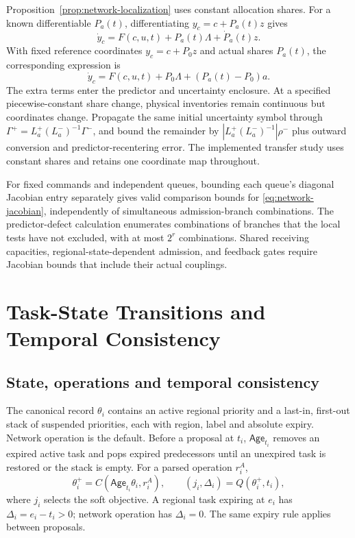 \documentclass[journal,10pt]{IEEEtran}
\begin{document}
Proposition~\ref{prop:network-localization} uses constant allocation shares.
For a known differentiable $P_a(t)$, differentiating $y_c=c+P_a(t)z$ gives
\begin{equation}
 \dot y_c=F(c,u,t)+P_a(t)\Lambda+\dot P_a(t)z.
 \label{eq:network-varying-allocation}
\end{equation}
With fixed reference coordinates $y_c=c+P_0z$ and actual shares $P_a(t)$,
the corresponding expression is
\begin{equation}
 \dot y_c=F(c,u,t)+P_0\Lambda+(P_a(t)-P_0)a.
 \label{eq:network-uncertain-allocation}
\end{equation}
The extra terms enter the predictor and uncertainty enclosure. At a specified
piecewise-constant share change, physical inventories remain continuous but
coordinates change. Propagate the same initial uncertainty symbol through
$\Gamma^+=L_a^+(L_a^-)^{-1}\Gamma^-$, and bound the remainder by
$|L_a^+(L_a^-)^{-1}|\rho^-$ plus outward conversion and predictor-recentering
error. The implemented
transfer study uses constant shares and retains one coordinate map throughout.

For fixed commands and independent queues, bounding each queue's diagonal
Jacobian entry separately gives valid comparison bounds for
\eqref{eq:network-jacobian}, independently of simultaneous admission-branch
combinations. The predictor-defect calculation enumerates combinations of
branches that the local tests have not excluded, with at most $2^r$
combinations. Shared receiving capacities, regional-state-dependent
admission, and feedback gates require Jacobian bounds that include their
actual couplings.

\section{Task-State Transitions and Temporal Consistency}
\label{app:task-state-compiler}

\subsection{State, operations and temporal consistency}

The canonical record $\theta_i$ contains an active regional priority and a
last-in, first-out stack of suspended priorities, each with region, label and
absolute expiry. Network operation is the default. Before a proposal at $t_i$,
$\mathsf{Age}_{t_i}$ removes an expired active task and pops expired predecessors until
an unexpired task is restored or the stack is empty. For a parsed operation
$r_i^A$,
\begin{equation}
 \theta_i^+=C(\mathsf{Age}_{t_i}\theta_i,r_i^A),\qquad
 (j_i,\Delta_i)=Q(\theta_i^+,t_i),
 \label{eq:task-state-compiler}
\end{equation}
where $j_i$ selects the soft objective. A regional task expiring at $e_i$
has $\Delta_i=e_i-t_i>0$; network operation has $\Delta_i=0$.
The same expiry rule applies between proposals.
\end{document}
